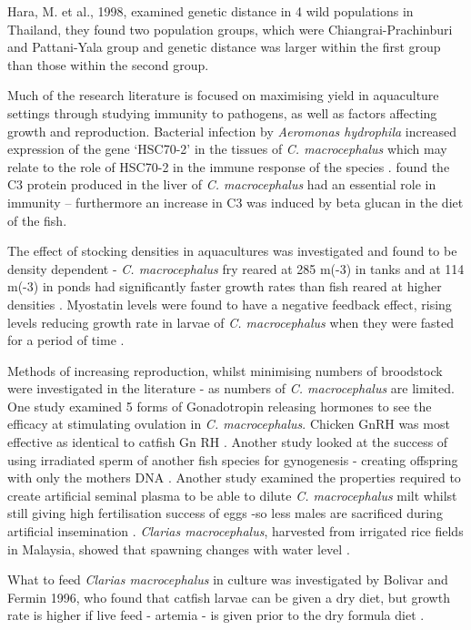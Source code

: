 \documentclass[]{book}
\theoremstyle{definition}
\theoremstyle{definition}
\theoremstyle{definition}
\theoremstyle{remark}
\begin{document}
Hara, M. et al., 1998, examined genetic distance in 4 wild populations
in Thailand, they found two population groups, which were
Chiangrai-Prachinburi and Pattani-Yala group and genetic distance was
larger within the first group than those within the second group.

Much of the research literature is focused on maximising yield in
aquaculture settings through studying immunity to pathogens, as well as
factors affecting growth and reproduction. Bacterial infection by
\emph{Aeromonas hydrophila} increased expression of the gene `HSC70-2'
in the tissues of \emph{C. macrocephalus} which may relate to the role
of HSC70-2 in the immune response of the species \citep{Poompoung_2012}.
\citet{Poompoung_2012} found the C3 protein produced in the liver of
\emph{C. macrocephalus} had an essential role in immunity -- furthermore
an increase in C3 was induced by beta glucan in the diet of the fish.

The effect of stocking densities in aquacultures was investigated and
found to be density dependent - \emph{C. macrocephalus} fry reared at
285 m(-3) in tanks and at 114 m(-3) in ponds had significantly faster
growth rates than fish reared at higher densities \citep{Bombeo_2002}.
Myostatin levels were found to have a negative feedback effect, rising
levels reducing growth rate in larvae of \emph{C. macrocephalus} when
they were fasted for a period of time \citep{Kanjanaworakul_2014}.

Methods of increasing reproduction, whilst minimising numbers of
broodstock were investigated in the literature - as numbers of \emph{C.
macrocephalus} are limited. One study examined 5 forms of Gonadotropin
releasing hormones to see the efficacy at stimulating ovulation in
\emph{C. macrocephalus}. Chicken GnRH was most effective as identical to
catfish Gn RH \citep{Ngamvongchon_1992}. Another study looked at the
success of using irradiated sperm of another fish species for
gynogenesis - creating offspring with only the mothers DNA
\citep{Na_Nakorn_2004}. Another study examined the properties required
to create artificial seminal plasma to be able to dilute \emph{C.
macrocephalus} milt whilst still giving high fertilisation success of
eggs -so less males are sacrificed during artificial insemination
\citep{Tan_Fermin_1999}. \emph{Clarias macrocephalus}, harvested from
irrigated rice fields in Malaysia, showed that spawning changes with
water level \citep{Ali_1993}.

What to feed \emph{Clarias macrocephalus} in culture was investigated by
Bolivar and Fermin 1996, who found that catfish larvae can be given a
dry diet, but growth rate is higher if live feed - artemia - is given
prior to the dry formula diet \citep{Fermin_1996}.
\end{document}
